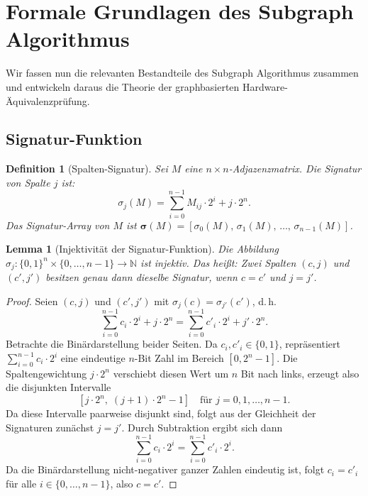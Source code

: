 ﻿\documentclass[12pt,a4paper]{report}
\newtheorem{definition}{Definition}[section]
\newtheorem{lemma}[theorem]{Lemma}
\begin{document}
\section{Formale Grundlagen des Subgraph Algorithmus}

Wir fassen nun die relevanten Bestandteile des Subgraph Algorithmus \cite{subgraph2026} zusammen und entwickeln daraus die Theorie der graphbasierten Hardware-Äquivalenzprüfung.

\subsection{Signatur-Funktion}

\begin{definition}[Spalten-Signatur]
\label{def:signatur}
Sei $M$ eine $n \times n$-Adjazenzmatrix. Die \emph{Signatur} von Spalte $j$ ist:
\[
\sigma_j(M) = \sum_{i=0}^{n-1} M_{ij} \cdot 2^i + j \cdot 2^n.
\]
Das \emph{Signatur-Array} von $M$ ist $\boldsymbol{\sigma}(M) = [\sigma_0(M),\, \sigma_1(M),\, \ldots,\, \sigma_{n-1}(M)]$.
\end{definition}

\begin{lemma}[Injektivität der Signatur-Funktion]
\label{lem:injektivitaet}
Die Abbildung $\sigma_j: \{0,1\}^n \times \{0,\ldots,n-1\} \to \mathbb{N}$ ist injektiv. Das heißt: Zwei Spalten $(c, j)$ und $(c', j')$ besitzen genau dann dieselbe Signatur, wenn $c = c'$ und $j = j'$.
\end{lemma}

\begin{proof}
Seien $(c, j)$ und $(c', j')$ mit $\sigma_j(c) = \sigma_{j'}(c')$, d.\,h.\
\[
\sum_{i=0}^{n-1} c_i \cdot 2^i + j \cdot 2^n = \sum_{i=0}^{n-1} c'_i \cdot 2^i + j' \cdot 2^n.
\]
Betrachte die Binärdarstellung beider Seiten. Da $c_i, c'_i \in \{0,1\}$, repräsentiert $\sum_{i=0}^{n-1} c_i \cdot 2^i$ eine eindeutige $n$-Bit Zahl im Bereich $[0, 2^n - 1]$. Die Spaltengewichtung $j \cdot 2^n$ verschiebt diesen Wert um $n$ Bit nach links, erzeugt also die disjunkten Intervalle
\[
[j \cdot 2^n,\; (j+1) \cdot 2^n - 1] \quad \text{für } j = 0, 1, \ldots, n-1.
\]
Da diese Intervalle paarweise disjunkt sind, folgt aus der Gleichheit der Signaturen zunächst $j = j'$. Durch Subtraktion ergibt sich dann
\[
\sum_{i=0}^{n-1} c_i \cdot 2^i = \sum_{i=0}^{n-1} c'_i \cdot 2^i.
\]
Da die Binärdarstellung nicht-negativer ganzer Zahlen eindeutig ist, folgt $c_i = c'_i$ für alle $i \in \{0,\ldots,n-1\}$, also $c = c'$.
\end{proof}
\end{document}
